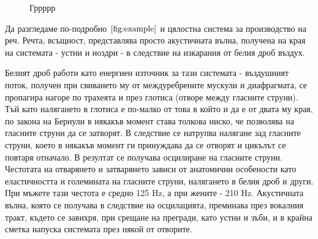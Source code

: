 \documentclass[12pt]{report}
\numberwithin{equation}{section}
\numberwithin{figure}{section}
\begin{document}
\begin{figure}[ht]
\begin{changemargin}{0cm}{0cm}
{                %
            }
        \end{changemargin} 

        \caption{Гррррр}%
        \label{fig:example}%
    \end{figure}
    
    Да разгледаме по-подробно $\autoref{fig:example}$ и цялостна система за производство на реч.
    Речта, всъщност, представлява просто акустичната вълна, получена на края на системата - устни и ноздри - в следствие на изкарания от белия дроб въздух.

    Белият дроб работи като енергиен източник за тази системата - въздушният поток, получен при свиването му от междуребрените мускули и диафрагмата,
    се пропагира нагоре по трахеята и през глотиса (отворе между гласните струни). Тъй като налягането в глотиса е по-малко от това в който и да е от двата му края, по закона на Бернули
    в някакъв момент става толкова ниско, че позволява на гласните струни да се затворят. В следствие се натрупва налягане зад гласните струни, което в някакъв момент ги принуждава
    да се отворят и цикълът се повтаря отначало. В резултат се получава осцилиране на гласните струни. Честотата на отварянето и затварянето зависи от анатомични особености като еластичността и големината на
    гласните струни, налягането в белия дроб и други. При мъжете тази честота е средно 125 Hz, а при жените - 210 Hz. Акустичната вълна, която се получава в следствие на осцилацията,
    преминава през вокалния тракт, където се завихря, при срещане на прегради, като устни и зъби, и в крайна сметка напуска системата през някой от отворите.
\end{document}
